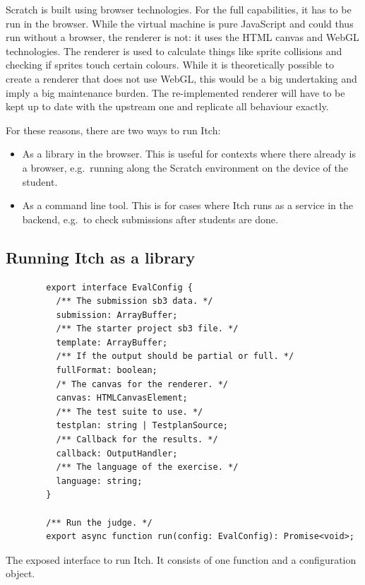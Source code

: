 \documentclass[../main]{subfiles}
\begin{document}
Scratch is built using browser technologies.
For the full capabilities, it has to be run in the browser.
While the virtual machine is pure JavaScript and could thus run without a browser, the renderer is not: it uses the HTML canvas and WebGL technologies.
The renderer is used to calculate things like sprite collisions and checking if sprites touch certain colours.
While it is theoretically possible to create a renderer that does not use WebGL, this would be a big undertaking and imply a big maintenance burden.
The re-implemented renderer will have to be kept up to date with the upstream one and replicate all behaviour exactly.

For these reasons, there are two ways to run Itch:

\begin{itemize}
    \item As a library in the browser.
          This is useful for contexts where there already is a browser, e.g.\ running along the Scratch environment on the device of the student.
    \item As a command line tool.
          This is for cases where Itch runs as a service in the backend, e.g.\ to check submissions after students are done.
\end{itemize}

\subsection{Running Itch as a library}\label{subsec:running-itch-as-a-library}

\begin{listing}
    \begin{verbatim}
        export interface EvalConfig {
          /** The submission sb3 data. */
          submission: ArrayBuffer;
          /** The starter project sb3 file. */
          template: ArrayBuffer;
          /** If the output should be partial or full. */
          fullFormat: boolean;
          /* The canvas for the renderer. */
          canvas: HTMLCanvasElement;
          /** The test suite to use. */
          testplan: string | TestplanSource;
          /** Callback for the results. */
          callback: OutputHandler;
          /** The language of the exercise. */
          language: string;
        }

        /** Run the judge. */
        export async function run(config: EvalConfig): Promise<void>;
    \end{verbatim}
    \caption{The exposed interface to run Itch. It consists of one function and a configuration object.}\label{lst:itch-library-interface}
\end{listing}
\end{document}
